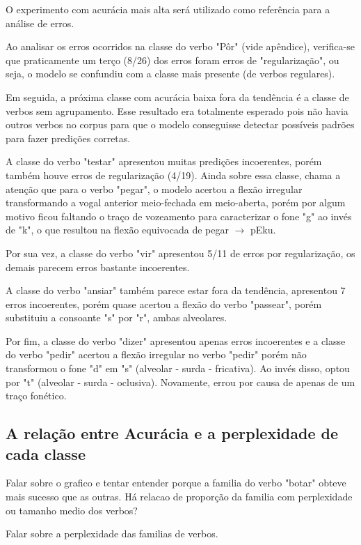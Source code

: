 O experimento com acurácia mais alta será utilizado como referência para a análise de erros.

Ao analisar os erros ocorridos na classe do verbo "Pôr" (vide apêndice), verifica-se que praticamente um terço (8/26) dos erros foram erros de "regularização", ou seja, o modelo se confundiu com a classe mais presente (de verbos regulares). 

Em seguida, a próxima classe com acurácia baixa fora da tendência é a classe de verbos sem agrupamento. Esse resultado era totalmente esperado pois não havia outros verbos no corpus para que o modelo conseguisse detectar possíveis padrões para fazer predições corretas. 

A classe do verbo "testar" apresentou muitas predições incoerentes, porém também houve erros de regularização (4/19). Ainda sobre essa classe, chama a atenção que para o verbo "pegar", o modelo acertou a flexão irregular transformando a vogal anterior meio-fechada em meio-aberta, porém por algum motivo ficou faltando o traço de vozeamento para caracterizar o fone "g" ao invés de "k", o que resultou na flexão equivocada de pegar $\rightarrow$ pEku.

Por sua vez, a classe do verbo "vir" apresentou 5/11 de erros por regularização, os demais parecem erros bastante incoerentes.

A classe do verbo "ansiar" também parece estar fora da tendência, apresentou 7 erros incoerentes, porém quase acertou a flexão do verbo "passear", porém substituiu a consoante "s" por "r", ambas alveolares.

Por fim, a classe do verbo "dizer" apresentou apenas erros incoerentes e a classe do verbo "pedir" acertou a flexão irregular no verbo "pedir" porém não transformou o fone "d" em "s" (alveolar - surda - fricativa). Ao invés disso, optou por "t" (alveolar - surda - oclusiva). Novamente, errou por causa de apenas de um traço fonético.



\subsection{A relação entre Acurácia e a perplexidade de cada classe}

Falar sobre o grafico e tentar entender porque a familia do verbo "botar" obteve mais sucesso que as outras. Há relacao de proporção da familia com perplexidade ou tamanho medio dos verbos?

Falar sobre a perplexidade das familias de verbos.

